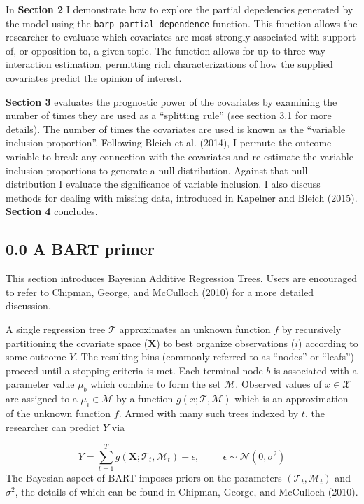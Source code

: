 \documentclass[]{article}
\begin{document}
In \textbf{Section 2} I demonstrate how to explore the partial
depedencies generated by the model using the
\texttt{barp\_partial\_dependence} function. This function allows the
researcher to evaluate which covariates are most strongly associated
with support of, or opposition to, a given topic. The function allows
for up to three-way interaction estimation, permitting rich
characterizations of how the supplied covariates predict the opinion of
interest.

\textbf{Section 3} evaluates the prognostic power of the covariates by
examining the number of times they are used as a ``splitting rule'' (see
section 3.1 for more details). The number of times the covariates are
used is known as the ``variable inclusion proportion''. Following Bleich
et al. (2014), I permute the outcome variable to break any connection
with the covariates and re-estimate the variable inclusion proportions
to generate a null distribution. Against that null distribution I
evaluate the significance of variable inclusion. I also discuss methods
for dealing with missing data, introduced in Kapelner and Bleich (2015).
\textbf{Section 4} concludes.

\subsection{0.0 A BART primer}\label{a-bart-primer}

This section introduces Bayesian Additive Regression Trees. Users are
encouraged to refer to Chipman, George, and McCulloch (2010) for a more
detailed discussion.

A single regression tree \(\mathcal{T}\) approximates an unknown
function \(f\) by recursively partitioning the covariate space
(\(\mathbf{X}\)) to best organize observations (\(i\)) according to some
outcome \(Y\). The resulting bins (commonly referred to as ``nodes'' or
``leafs'') proceed until a stopping criteria is met. Each terminal node
\(b\) is associated with a parameter value \(\mu_b\) which combine to
form the set \(\mathcal{M}\). Observed values of \(x \in \mathcal{X}\)
are assigned to a \(\mu_i \in \mathcal{M}\) by a function
\(g(x; \mathcal{T},\mathcal{M})\) which is an approximation of the
unknown function \(f\). Armed with many such trees indexed by \(t\), the
researcher can predict \(Y\) via

\[ Y = \sum_{t=1}^T g(\mathbf{X}; \mathcal{T}_t,\mathcal{M}_t) + \epsilon, \hspace{1cm} \epsilon \sim \mathcal{N}(0,\sigma^2)\]
The Bayesian aspect of BART imposes priors on the parameters
\((\mathcal{T}_t,\mathcal{M}_t)\) and \(\sigma^2\), the details of which
can be found in Chipman, George, and McCulloch (2010).
\end{document}
